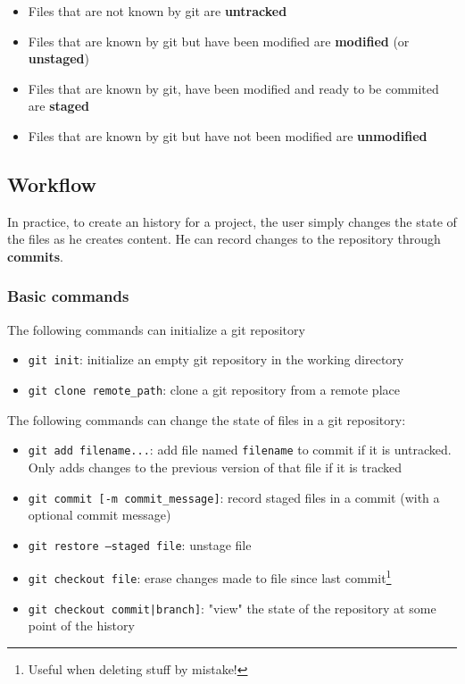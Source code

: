\documentclass[12pt]{article}
\begin{document}
\begin{itemize}
\item Files that are not known by git are \textbf{untracked}
\item Files that are known by git but have been modified are \textbf{modified} (or \textbf{unstaged})
\item Files that are known by git, have been modified and ready to be commited are \textbf{staged}
\item Files that are known by git but have not been modified are \textbf{unmodified}
\end{itemize}

\subsection{Workflow}

In practice, to create an history for a project, the user simply changes the state of the files as he creates content. He can record changes to the repository through \textbf{commits}.

\subsubsection{Basic commands}

The following commands can initialize a git repository
\begin{itemize}
\item \texttt{git init}: initialize an empty git repository in the working directory
\item \texttt{git clone remote\_path}: clone a git repository from a remote place
\end{itemize}

The following commands can change the state of files in a git repository:
\begin{itemize}
\item \texttt{git add filename...}: add file named \texttt{filename} to commit if it is untracked. Only adds changes to the previous version of that file if it is tracked
\item \texttt{git commit [-m commit\_message]}: record staged files in a commit (with a optional commit message)
\item \texttt{git restore --staged file}: unstage file
\item \texttt{git checkout file}: erase changes made to file since last commit\footnote{Useful when deleting stuff by mistake!}
\item \texttt{git checkout commit|branch]}: "view" the state of the repository at some point of the history
\end{itemize}
\end{document}
